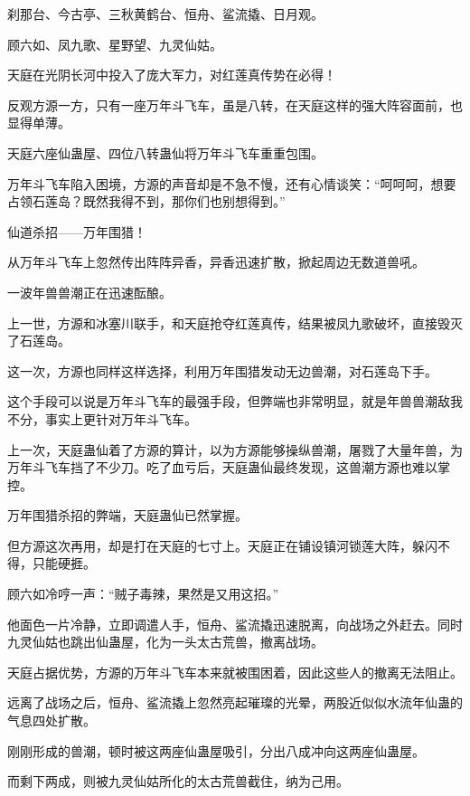 
\begin{this_body}

刹那台、今古亭、三秋黄鹤台、恒舟、鲨流撬、日月观。

顾六如、凤九歌、星野望、九灵仙姑。

天庭在光阴长河中投入了庞大军力，对红莲真传势在必得！

反观方源一方，只有一座万年斗飞车，虽是八转，在天庭这样的强大阵容面前，也显得单薄。

天庭六座仙蛊屋、四位八转蛊仙将万年斗飞车重重包围。

万年斗飞车陷入困境，方源的声音却是不急不慢，还有心情谈笑：“呵呵呵，想要占领石莲岛？既然我得不到，那你们也别想得到。”

仙道杀招——万年围猎！

从万年斗飞车上忽然传出阵阵异香，异香迅速扩散，掀起周边无数道兽吼。

一波年兽兽潮正在迅速酝酿。

上一世，方源和冰塞川联手，和天庭抢夺红莲真传，结果被凤九歌破坏，直接毁灭了石莲岛。

这一次，方源也同样这样选择，利用万年围猎发动无边兽潮，对石莲岛下手。

这个手段可以说是万年斗飞车的最强手段，但弊端也非常明显，就是年兽兽潮敌我不分，事实上更针对万年斗飞车。

上一次，天庭蛊仙着了方源的算计，以为方源能够操纵兽潮，屠戮了大量年兽，为万年斗飞车挡了不少刀。吃了血亏后，天庭蛊仙最终发现，这兽潮方源也难以掌控。

万年围猎杀招的弊端，天庭蛊仙已然掌握。

但方源这次再用，却是打在天庭的七寸上。天庭正在铺设镇河锁莲大阵，躲闪不得，只能硬捱。

顾六如冷哼一声：“贼子毒辣，果然是又用这招。”

他面色一片冷静，立即调遣人手，恒舟、鲨流撬迅速脱离，向战场之外赶去。同时九灵仙姑也跳出仙蛊屋，化为一头太古荒兽，撤离战场。

天庭占据优势，方源的万年斗飞车本来就被围困着，因此这些人的撤离无法阻止。

远离了战场之后，恒舟、鲨流撬上忽然亮起璀璨的光晕，两股近似似水流年仙蛊的气息四处扩散。

刚刚形成的兽潮，顿时被这两座仙蛊屋吸引，分出八成冲向这两座仙蛊屋。

而剩下两成，则被九灵仙姑所化的太古荒兽截住，纳为己用。


\end{this_body}
